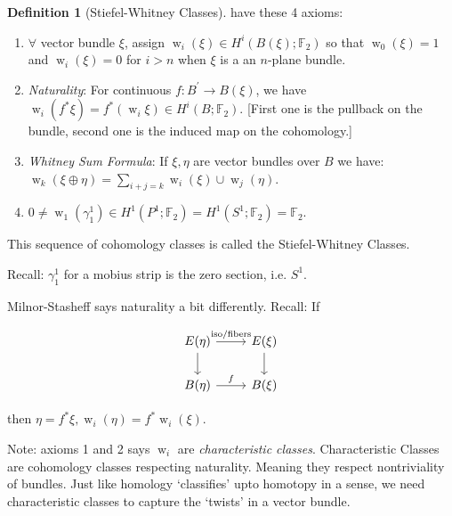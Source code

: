 \documentclass{article}
\theoremstyle{definition}
\newtheorem*{definition}{Definition}
\begin{document}
    \begin{definition}
        [Stiefel-Whitney Classes] have these 4 axioms:

        \begin{enumerate}[label=\arabic*)]
            \item \(\forall\) vector bundle \(\xi\), assign \(\operatorname{w}_i(\xi) \in H^i(B(\xi);\mathbb{F}_2)\) so that \(\operatorname{w}_0(\xi) = 1\) and \(\operatorname{w}_i(\xi) = 0\) for \(i > n\) when \(\xi\) is a an \(n\)-plane bundle.
            \item \textit{Naturality}: For continuous \(f: B^{\prime} \to B(\xi)\), we have \(\operatorname{w}_i(f^{\ast} \xi) = f^{\ast} (\operatorname{w}_i \xi) \in H^i(B;\mathbb{F}_2)\). [First one is the pullback on the bundle, second one is the induced map on the cohomology.]
            \item \textit{Whitney Sum Formula}: If \(\xi , \eta\) are vector bundles over \(B\) we have: \(\operatorname{w}_k(\xi \oplus \eta) = \sum_{i+j=k} \operatorname{w}_i(\xi) \cup \operatorname{w}_j(\eta) \).
            \item \(0 \neq \operatorname{w}_1(\gamma^1_1) \in H^1(P^1;\mathbb{F}_2) = H^1(S^1; \mathbb{F}_2) = \mathbb{F}_2\).
        \end{enumerate} 

        This sequence of cohomology classes is called the Stiefel-Whitney Classes.

    \end{definition}

    Recall: \(\gamma^1_1\) for a mobius strip is the zero section, i.e. \(S^1\).

    Milnor-Stasheff says naturality a bit differently. Recall: If

    \[
        \begin{tikzcd}
            E(\eta) \ar[r, "\text{iso/fibers}"] \ar[d] & E(\xi) \ar[d] \\ B(\eta) \ar[r,"f"] & B(\xi)
        \end{tikzcd}
    \]

    then \(\eta = f^{\ast} \xi, \operatorname{w}_i(\eta) = f^{\ast} \operatorname{w}_i(\xi)\).

    Note: axioms 1 and 2 says \(\operatorname{w}_i\) are \textit{characteristic classes}. Characteristic Classes are cohomology classes respecting naturality. Meaning they respect nontriviality of bundles. Just like homology `classifies' upto homotopy in a sense, we need characteristic classes to capture the `twists' in a vector bundle.
\end{document}
